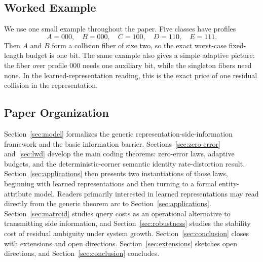 \subsection{Worked Example}

We use one small example throughout the paper. Five classes have profiles
\[
A=000,\quad B=000,\quad C=100,\quad D=110,\quad E=111.
\]
Then $A$ and $B$ form a collision fiber of size two, so the exact worst-case fixed-length budget is one bit. The same example also gives a simple adaptive picture: the fiber over profile $000$ needs one auxiliary bit, while the singleton fibers need none. In the learned-representation reading, this is the exact price of one residual collision in the representation.

\subsection{Paper Organization}

Section~\ref{sec:model} formalizes the generic representation-side-information framework and the basic information barrier. Sections~\ref{sec:zero-error} and~\ref{sec:lwd} develop the main coding theorems: zero-error laws, adaptive budgets, and the deterministic-corner semantic identity rate-distortion result. Section~\ref{sec:applications} then presents two instantiations of those laws, beginning with learned representations and then turning to a formal entity-attribute model. Readers primarily interested in learned representations may read directly from the generic theorem arc to Section~\ref{sec:applications}. Section~\ref{sec:matroid} studies query costs as an operational alternative to transmitting side information, and Section~\ref{sec:robustness} studies the stability cost of residual ambiguity under system growth. \ifdefined\JSAITREVIEW Section~\ref{sec:conclusion} closes with extensions and open directions. \else Section~\ref{sec:extensions} sketches open directions, and Section~\ref{sec:conclusion} concludes. \fi
